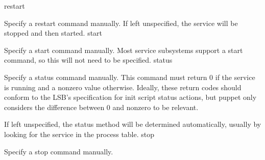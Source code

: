 restart

Specify a restart command manually. If left unspecified, the service will be stopped and then started.
start

Specify a start command manually. Most service subsystems support a start command, so this will not need to be specified.
status

Specify a status command manually. This command must return 0 if the service is running and a nonzero value otherwise. Ideally, these return codes should conform to the LSB’s specification for init script status actions, but puppet only considers the difference between 0 and nonzero to be relevant.

If left unspecified, the status method will be determined automatically, usually by looking for the service in the process table.
stop

Specify a stop command manually.
